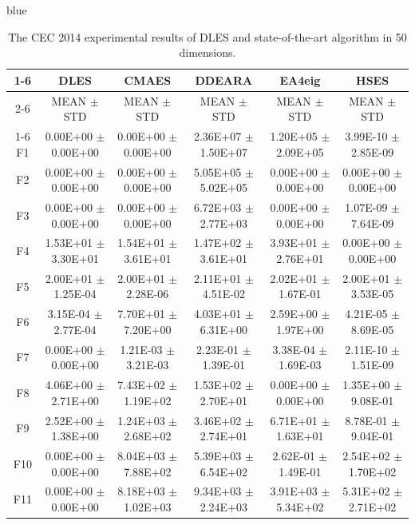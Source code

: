 \documentclass[journal, onecolumn]{IEEEtran}
\begin{document}
\begin{color}{blue}
\begin{table}[htbp!]
	\centering
	\caption{The CEC 2014 experimental results of DLES and state-of-the-art algorithm in 50 dimensions.}
	\label{CEC2014_50}
		\begin{tabular}{c|ccccc}
			\cline{1-6}
			 &	DLES			 &	CMAES				 &	DDEARA				 &	EA4eig				 &	HSES			\\	\cline{2-6}	
		&	MEAN	$\pm$	STD	 &	MEAN	$\pm$	STD		 &	MEAN	$\pm$	STD		 &	MEAN	$\pm$	STD		 &	MEAN	$\pm$	STD	\\	\cline{1-6}	
		F1	 &	0.00E+00	$\pm$	0.00E+00	 &	0.00E+00	$\pm$	0.00E+00		 &	2.36E+07	$\pm$	1.50E+07		 &	1.20E+05	$\pm$	2.09E+05		 &	3.99E-10	$\pm$	2.85E-09	\\		
		F2	 &	0.00E+00	$\pm$	0.00E+00	 &	0.00E+00	$\pm$	0.00E+00		 &	5.05E+05	$\pm$	5.02E+05		 &	0.00E+00	$\pm$	0.00E+00		 &	0.00E+00	$\pm$	0.00E+00	\\		
		F3	 &	0.00E+00	$\pm$	0.00E+00	 &	0.00E+00	$\pm$	0.00E+00		 &	6.72E+03	$\pm$	2.77E+03		 &	0.00E+00	$\pm$	0.00E+00		 &	1.07E-09	$\pm$	7.64E-09	\\		
		F4	 &	1.53E+01	$\pm$	3.30E+01	 &	1.54E+01	$\pm$	3.61E+01		 &	1.47E+02	$\pm$	3.61E+01		 &	3.93E+01	$\pm$	2.76E+01		 &	0.00E+00	$\pm$	0.00E+00	\\		
		F5	 &	2.00E+01	$\pm$	1.25E-04	 &	2.00E+01	$\pm$	2.28E-06		 &	2.11E+01	$\pm$	4.51E-02		 &	2.02E+01	$\pm$	1.67E-01		 &	2.00E+01	$\pm$	3.53E-05	\\		
		F6	 &	3.15E-04	$\pm$	2.77E-04	 &	7.70E+01	$\pm$	7.20E+00		 &	4.03E+01	$\pm$	6.31E+00		 &	2.59E+00	$\pm$	1.97E+00		 &	4.21E-05	$\pm$	8.69E-05	\\		
		F7	 &	0.00E+00	$\pm$	0.00E+00	 &	1.21E-03	$\pm$	3.21E-03		 &	2.23E-01	$\pm$	1.39E-01		 &	3.38E-04	$\pm$	1.69E-03		 &	2.11E-10	$\pm$	1.51E-09	\\		
		F8	 &	4.06E+00	$\pm$	2.71E+00	 &	7.43E+02	$\pm$	1.19E+02		 &	1.53E+02	$\pm$	2.70E+01		 &	0.00E+00	$\pm$	0.00E+00		 &	1.35E+00	$\pm$	9.08E-01	\\		
		F9	 &	2.52E+00	$\pm$	1.38E+00	 &	1.24E+03	$\pm$	2.68E+02		 &	3.46E+02	$\pm$	2.74E+01		 &	6.71E+01	$\pm$	1.63E+01		 &	8.78E-01	$\pm$	9.04E-01	\\		
		F10	 &	0.00E+00	$\pm$	0.00E+00	 &	8.04E+03	$\pm$	7.88E+02		 &	5.39E+03	$\pm$	6.54E+02		 &	2.62E-01	$\pm$	1.49E-01		 &	2.54E+02	$\pm$	1.70E+02	\\		
		F11	 &	0.00E+00	$\pm$	0.00E+00	 &	8.18E+03	$\pm$	1.02E+03		 &	9.34E+03	$\pm$	2.24E+03		 &	3.91E+03	$\pm$	5.34E+02		 &	5.31E+02	$\pm$	2.71E+02	\\		

\end{tabular}
\end{table}
\end{color}
\end{document}
